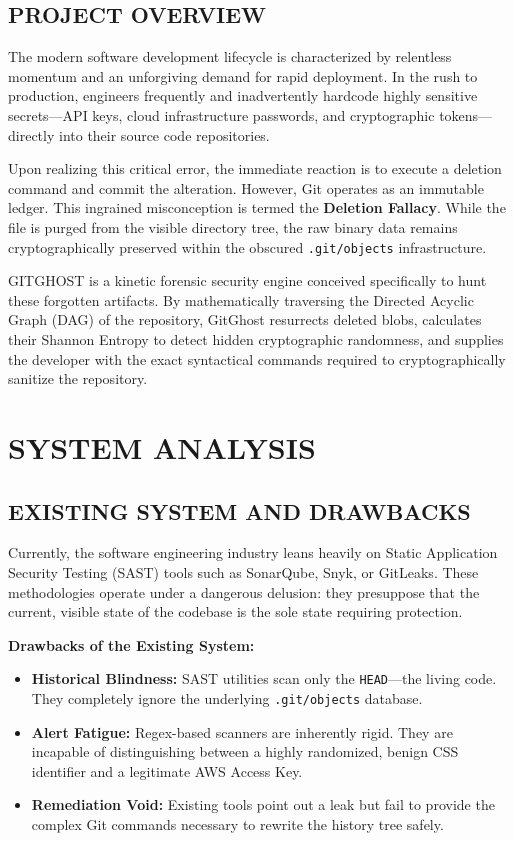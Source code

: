 \documentclass[12pt, a4paper, oneside]{report}
\begin{document}
\section{PROJECT OVERVIEW}
The modern software development lifecycle is characterized by relentless momentum and an unforgiving demand for rapid deployment. In the rush to production, engineers frequently and inadvertently hardcode highly sensitive secrets---API keys, cloud infrastructure passwords, and cryptographic tokens---directly into their source code repositories. 

Upon realizing this critical error, the immediate reaction is to execute a deletion command and commit the alteration. However, Git operates as an immutable ledger. This ingrained misconception is termed the \textbf{Deletion Fallacy}. While the file is purged from the visible directory tree, the raw binary data remains cryptographically preserved within the obscured \texttt{.git/objects} infrastructure.

GITGHOST is a kinetic forensic security engine conceived specifically to hunt these forgotten artifacts. By mathematically traversing the Directed Acyclic Graph (DAG) of the repository, GitGhost resurrects deleted blobs, calculates their Shannon Entropy to detect hidden cryptographic randomness, and supplies the developer with the exact syntactical commands required to cryptographically sanitize the repository.

\chapter{SYSTEM ANALYSIS}

\section{EXISTING SYSTEM AND DRAWBACKS}
Currently, the software engineering industry leans heavily on Static Application Security Testing (SAST) tools such as SonarQube, Snyk, or GitLeaks. These methodologies operate under a dangerous delusion: they presuppose that the current, visible state of the codebase is the sole state requiring protection.

\textbf{Drawbacks of the Existing System:}
\begin{itemize}
    \item \textbf{Historical Blindness:} SAST utilities scan only the \texttt{HEAD}---the living code. They completely ignore the underlying \texttt{.git/objects} database.
    \item \textbf{Alert Fatigue:} Regex-based scanners are inherently rigid. They are incapable of distinguishing between a highly randomized, benign CSS identifier and a legitimate AWS Access Key.
    \item \textbf{Remediation Void:} Existing tools point out a leak but fail to provide the complex Git commands necessary to rewrite the history tree safely.
\end{itemize}
\end{document}
